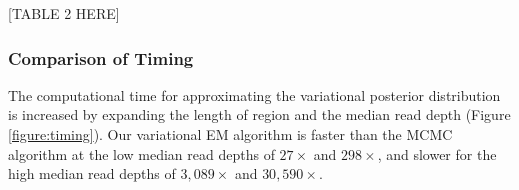 \documentclass{bmcart}
\begin{document}


\vspace{2em}
\begin{center}
[TABLE 2 HERE]  
\end{center}
\vspace{2em}


\subsubsection{Comparison of Timing}
The computational time for approximating the variational posterior distribution is increased by expanding the length of region and the median read depth (Figure \ref{figure:timing}).
Our variational EM algorithm is faster than the MCMC algorithm at the low median read depths of $27\times$ and $298\times$, and slower for the high median read depths of $3,089\times$ and $30,590\times$.
\end{document}
